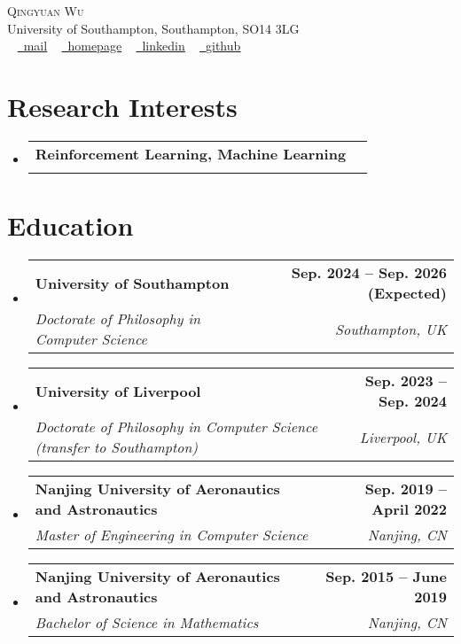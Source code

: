 \documentclass[letterpaper,11pt]{article}
\makeatletter
\newcommand{\resumeSubheading}[4]{
  \vspace{-2pt}\item
    \begin{tabular*}{1.0\textwidth}[t]{l@{\extracolsep{\fill}}r}
      \textbf{#1} & \textbf{\small #2} \\
      \textit{\small#3} & \textit{\small #4} \\
    \end{tabular*}\vspace{-7pt}
}
\newcommand{\resumeSubHeadingListStart}{\begin{itemize}[leftmargin=0.0in, label={}]}
\newcommand{\resumeSubHeadingListEnd}{\end{itemize}}
\makeatother
\begin{document}

\begin{center}
    {\Huge \scshape Qingyuan Wu} \\ \vspace{1pt}
    University of Southampton, Southampton, SO14 3LG \\ \vspace{1pt}
    \small 
    ~ \href{mailto:qingyuanwu4work@gmail.com}{\raisebox{-0.2\height}\faEnvelope\  \underline{mail}} 
    ~ \href{https://qingyuanwunothing.github.io/}{\raisebox{-0.2\height}\faHome\  \underline{homepage}} 
    ~ \href{https://linkedin.com/in/qingyuan-wu-441412290/}{\raisebox{-0.2\height}\faLinkedin\ \underline{linkedin}}  ~
    \href{https://github.com/QingyuanWuNothing}{\raisebox{-0.2\height}\faGithub\ \underline{github}}
    \vspace{-8pt}
\end{center}


\section{Research Interests}
  \resumeSubHeadingListStart
    \resumeSubheading{Reinforcement Learning, Machine Learning}{}
      {}{}
  \resumeSubHeadingListEnd
  
\section{Education}
  \resumeSubHeadingListStart
    \resumeSubheading
      {University of Southampton}{Sep. 2024 -- Sep. 2026 (Expected)}
      {Doctorate of Philosophy in Computer Science}{Southampton, UK}
  \resumeSubHeadingListEnd
  \resumeSubHeadingListStart
    \resumeSubheading
      {University of Liverpool}{Sep. 2023 -- Sep. 2024}
      {Doctorate of Philosophy in Computer Science (transfer to Southampton)}{Liverpool, UK}
  \resumeSubHeadingListEnd
  \resumeSubHeadingListStart
    \resumeSubheading
      {Nanjing University of Aeronautics and Astronautics}{Sep. 2019 -- April 2022}
      {Master of Engineering in Computer Science}{Nanjing, CN}
  \resumeSubHeadingListEnd
  \resumeSubHeadingListStart
    \resumeSubheading
      {Nanjing University of Aeronautics and Astronautics}{Sep. 2015 -- June 2019}
      {Bachelor of Science in Mathematics}{Nanjing, CN}
  \resumeSubHeadingListEnd
\end{document}
